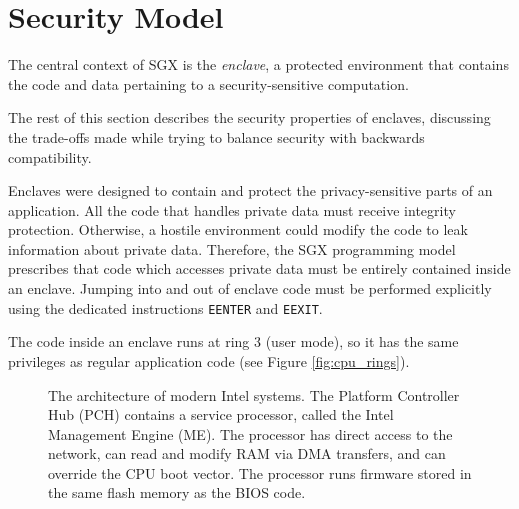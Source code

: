 \section{Security Model}
\label{sec:attestation}

The central context of SGX is the \textit{enclave}, a protected environment
that contains the code and data pertaining to a security-sensitive computation.

The rest of this section describes the security properties of
enclaves, discussing the trade-offs made while trying to balance security with
backwards compatibility.

Enclaves were designed to contain and protect the privacy-sensitive parts of an
application. All the code that handles private data must receive integrity
protection. Otherwise, a hostile environment could modify the code to leak
information about private data. Therefore, the SGX programming model prescribes
that code which accesses private data must be entirely contained inside an
enclave. Jumping into and out of enclave code must be performed explicitly
using the dedicated instructions \texttt{EENTER} and \texttt{EEXIT}.

The code inside an enclave runs at ring 3 (user mode), so it has the same
privileges as regular application code (see Figure \ref{fig:cpu_rings}).

\begin{figure}[hbtp]
  \caption{
    The architecture of modern Intel systems.
    The Platform Controller Hub (PCH) contains a service processor, called the
    Intel Management Engine (ME). The processor has direct access to the
    network, can read and modify RAM via DMA transfers, and can override the
    CPU boot vector. The processor runs firmware stored in the same flash
    memory as the BIOS code.
  }
  \label{fig:pch}
\end{figure}


